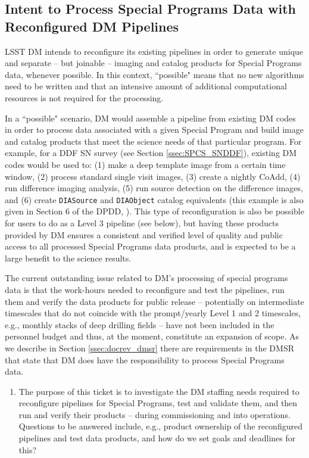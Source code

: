 \documentclass[DM,lsstdraft,toc]{lsstdoc}
\begin{document}
\subsection{Intent to Process Special Programs Data with Reconfigured DM Pipelines}\label{ssec:dmplans_reconfig}

LSST DM intends to reconfigure its existing pipelines in order to generate unique and separate -- but joinable -- imaging and catalog products for Special Programs data, whenever possible. In this context, ``possible" means that no new algorithms need to be written and that an intensive amount of additional computational resources is not required for the processing.

In a ``possible" scenario, DM would assemble a pipeline from existing DM codes in order to process data associated with a given Special Program and build image and catalog products that meet the science needs of that particular program. For example, for a DDF SN survey (see Section \ref{ssec:SPCS_SNDDF}), existing DM codes would be used to: (1) make a deep template image from a certain time window, (2) process standard single visit images, (3) create a nightly CoAdd, (4) run difference imaging analysis, (5) run source detection on the difference images, and (6) create {\tt DIASource} and {\tt DIAObject} catalog equivalents (this example is also given in Section 6 of the DPDD, \cite{LSE-163}). This type of reconfiguration is also be possible for users to do as a Level 3 pipeline (see below), but having these products provided by DM ensures a consistent and verified level of quality and public access to all processed Special Programs data products, and is expected to be a large benefit to the science results.

The current outstanding issue related to DM's processing of special programs data is that the work-hours needed to reconfigure and test the pipelines, run them and verify the data products for public release -- potentially on intermediate timescales that do not coincide with the prompt/yearly Level 1 and 2 timescales, e.g., monthly stacks of deep drilling fields -- have not been included in the personnel budget and thus, at the moment, constitute an expansion of scope. As we describe in Section \ref{ssec:docrev_dmsr} there are requirements in the DMSR that state that DM does have the responsibility to process Special Programs data. 

\begin{enumerate}[resume,topsep=-10pt,after=\vspace{10pt},label= \textbf{Action \Roman*}] \item \label{reconfig-1} The purpose of this ticket is to investigate the DM staffing needs required to reconfigure pipelines for Special Programs, test and validate them, and then run and verify their products -- during commissioning and into operations. Questions to be answered include, e.g., product ownership of the reconfigured pipelines and test data products, and how do we set goals and deadlines for this? \end{enumerate}
\end{document}
